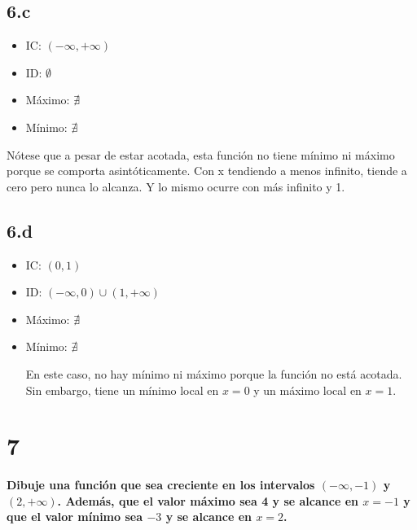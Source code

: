 \documentclass{article}
\begin{document}
\subsection*{6.c}
\label{subsec:6.c}

\begin{itemize}

\item IC: $(-\infty, +\infty)$

\item ID: $\emptyset$

\item Máximo: $\nexists$

\item Mínimo: $\nexists$

\end{itemize}

Nótese que a pesar de estar acotada, esta función no tiene mínimo ni máximo porque se comporta asintóticamente. Con x tendiendo a menos infinito, tiende a cero pero nunca lo alcanza. Y lo mismo ocurre con más infinito y 1.

\subsection*{6.d}
\label{subsec:6.d}

\begin{itemize}

\item IC: $(0, 1)$

\item ID: $(-\infty, 0) \cup (1, +\infty)$

\item Máximo: $\nexists$

\item Mínimo: $\nexists$

En este caso, no hay mínimo ni máximo porque la función no está acotada. Sin embargo, tiene un mínimo local en $x = 0$ y un máximo local en $x = 1$.

\end{itemize}

\section*{7}
\label{sec:7}

\textbf{Dibuje una función que sea creciente en los intervalos $(-\infty, -1)$ y $(2, +\infty)$. Además, que el valor máximo sea 4 y se alcance en $x = -1$ y que el valor mínimo sea $-3$ y se alcance en $x = 2$.}
\end{document}
